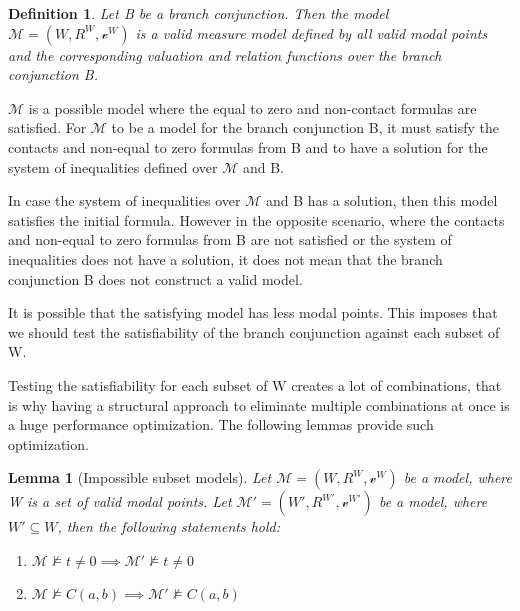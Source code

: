 \documentclass{article}
\newtheorem{defn}{Definition}[section]
\newtheorem{lemma}[theorem]{Lemma}
\newcommand{\vE}{\mathscr{v}}
\begin{document}
	\begin{defn}%
	Let B be a branch conjunction. Then the model $\mathcal{M} = (W, R^W, \vE^W)$ is a valid measure model defined by all valid modal points and the corresponding valuation and relation functions over the branch conjunction B.
	\end{defn}

	$\mathcal{M}$ is a possible model where the equal to zero and non-contact formulas are satisfied. For $\mathcal{M}$ to be a model for the branch conjunction B,
	it must satisfy the contacts and non-equal to zero formulas from B and to have a solution for the system of inequalities defined over $\mathcal{M}$ and B.

	In case the system of inequalities over $\mathcal{M}$ and B has a solution, then this model satisfies the initial formula.
	However in the opposite scenario, where the contacts and non-equal to zero formulas from B are not satisfied or the system of inequalities does not have a solution,
	it does not mean that the branch conjunction B does not construct a valid model.

	It is possible that the satisfying model has less modal points. 
	This imposes that we should test the satisfiability of the branch conjunction against each subset of W.
	
	Testing the satisfiability for each subset of W creates a lot of combinations, that is why having a structural approach to eliminate 
	multiple combinations at once is a huge performance optimization. The following lemmas provide such optimization.

	\begin{lemma}[Impossible subset models] \label{impossible-subset-models}
		Let $\mathcal{M} = (W, R^W, \vE^W)$ be a model, where W is a set of valid modal points.
		Let $\mathcal{M'} = (W', R^{W'}, \vE^{W'})$ be a model, where $W' \subseteq W$, then the following statements hold:
	\begin{enumerate}
		\item $\mathcal{M} \not\models t \neq 0 \implies \mathcal{M'} \not\models t \neq 0$
		\item $\mathcal{M} \not\models C(a,b) \implies \mathcal{M'} \not\models C(a,b)$
	\end{enumerate}
	\end{lemma}
\end{document}
